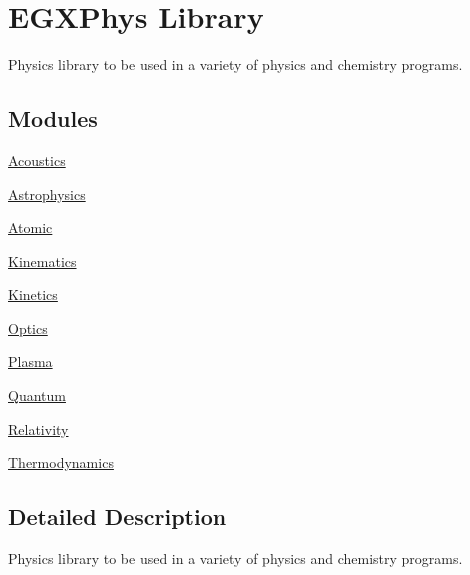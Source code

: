 \hypertarget{group___e_g_x_phys}{}\section{E\+G\+X\+Phys Library}
\label{group___e_g_x_phys}


Physics library to be used in a variety of physics and chemistry programs.  


\subsection*{Modules}
\begin{DoxyCompactItemize}
\item 
\mbox{\hyperlink{group___e_g_x_phys-_acoustics}{Acoustics}}
\item 
\mbox{\hyperlink{group___e_g_x_phys-_astrophysics}{Astrophysics}}
\item 
\mbox{\hyperlink{group___e_g_x_phys-_atomic}{Atomic}}
\item 
\mbox{\hyperlink{group___kinematics}{Kinematics}}
\item 
\mbox{\hyperlink{group___e_g_x_phys-_kinetics}{Kinetics}}
\item 
\mbox{\hyperlink{group___e_g_x_phys-_optics}{Optics}}
\item 
\mbox{\hyperlink{group___e_g_x_phys-_plasma}{Plasma}}
\item 
\mbox{\hyperlink{group___e_g_x_phys-_quantum}{Quantum}}
\item 
\mbox{\hyperlink{group___e_g_x_phys-_relativity}{Relativity}}
\item 
\mbox{\hyperlink{group___e_g_x_phys-_thermodynamics}{Thermodynamics}}
\end{DoxyCompactItemize}


\subsection{Detailed Description}
Physics library to be used in a variety of physics and chemistry programs. 

